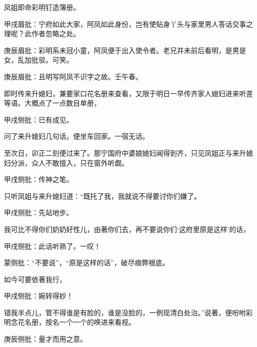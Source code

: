 \begin{parag}


    凤姐即命彩明钉造簿册。\begin{note}甲戌眉批：宁府如此大家，阿凤如此身份，岂有使贴身丫头与家里男人答话交事之理呢？此作者忽略之处。\end{note}\begin{note}庚辰眉批：彩明系未冠小童，阿凤便于出入使令者。老兄并未前后看明，是男是女，乱加批驳。可笑。\end{note}\begin{note}庚辰眉批：且明写阿凤不识字之故。壬午春。\end{note}即时传来升媳妇，兼要家口花名册来查看，又限于明日一早传齐家人媳妇进来听差等语。大概点了一点数目单册，\begin{note}甲戌侧批：已有成见。\end{note}问了来升媳妇几句话，便坐车回家。一宿无话。
\end{parag}


\begin{parag}


    至次日，卯正二刻便过来了。那宁国府中婆娘媳妇闻得到齐，只见凤姐正与来升媳妇分派，众人不敢擅入，只在窗外听觑。\begin{note}甲戌侧批：传神之笔。\end{note}只听凤姐与来升媳妇道：“既托了我，我就说不得要讨你们嫌了。\begin{note}甲戌侧批：先站地步。\end{note}我可比不得你们奶奶好性儿，由著你们去，再不要说你们‘这府里原是这样’的话，\begin{note}甲戌侧批：此话听熟了。一叹！\end{note}\begin{note}蒙侧批：“不要说”，“原是这样的话”，破尽痼弊根底。\end{note}如今可要依著我行，\begin{note}甲戌侧批：婉转得妙！\end{note}错我半点儿，管不得谁是有脸的，谁是没脸的，一例现清白处治。”说著，便吩咐彩明念花名册，按名一个一个的唤进来看视。\begin{note}庚辰侧批：量才而用之意。\end{note}
\end{parag}


